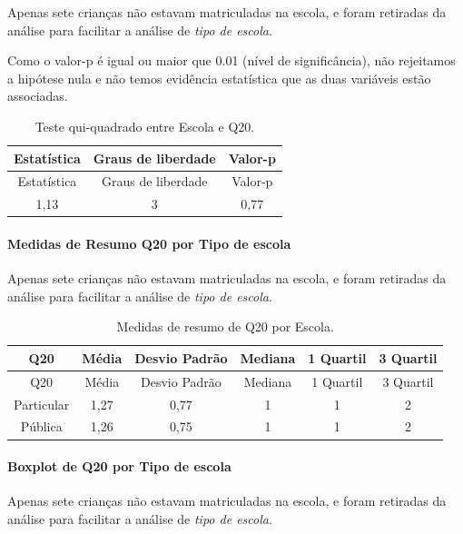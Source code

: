\documentclass[]{article}
\let\oldparagraph\paragraph
\renewcommand{\paragraph}[1]{\oldparagraph{#1}\mbox{}}
\begin{document}
Apenas sete crianças não estavam matriculadas na escola, e foram retiradas da análise para facilitar a análise de \emph{tipo de escola}.

Como o valor-p é igual ou maior que 0.01 (nível de significância), não rejeitamos a hipótese nula e não temos evidência estatística que as duas variáveis estão associadas.

\begin{longtable}[]{@{}ccc@{}}
\caption{\label{tab:unnamed-chunk-410}Teste qui-quadrado entre Escola e Q20.}\tabularnewline
\toprule
Estatística & Graus de liberdade & Valor-p\tabularnewline
\midrule
\endfirsthead
\toprule
Estatística & Graus de liberdade & Valor-p\tabularnewline
\midrule
\endhead
1,13 & 3 & 0,77\tabularnewline
\bottomrule
\end{longtable}

\cleardoublepage

\hypertarget{medidas-de-resumo-q20-por-tipo-de-escola}{%
\paragraph{Medidas de Resumo Q20 por Tipo de escola}\label{medidas-de-resumo-q20-por-tipo-de-escola}}

Apenas sete crianças não estavam matriculadas na escola, e foram retiradas da análise para facilitar a análise de \emph{tipo de escola}.

\begin{longtable}[]{@{}cccccc@{}}
\caption{\label{tab:unnamed-chunk-411}Medidas de resumo de Q20 por Escola.}\tabularnewline
\toprule
Q20 & Média & Desvio Padrão & Mediana & 1 Quartil & 3 Quartil\tabularnewline
\midrule
\endfirsthead
\toprule
Q20 & Média & Desvio Padrão & Mediana & 1 Quartil & 3 Quartil\tabularnewline
\midrule
\endhead
Particular & 1,27 & 0,77 & 1 & 1 & 2\tabularnewline
Pública & 1,26 & 0,75 & 1 & 1 & 2\tabularnewline
\bottomrule
\end{longtable}

\hypertarget{boxplot-de-q20-por-tipo-de-escola}{%
\paragraph{Boxplot de Q20 por Tipo de escola}\label{boxplot-de-q20-por-tipo-de-escola}}

Apenas sete crianças não estavam matriculadas na escola, e foram retiradas da análise para facilitar a análise de \emph{tipo de escola}.
\end{document}
